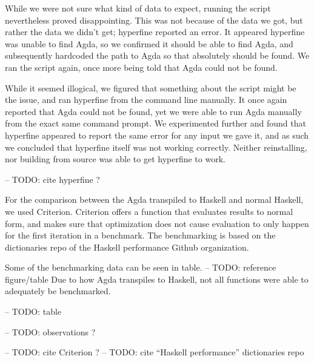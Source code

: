 \documentclass[a4paper,UKenglish,cleveref, autoref, thm-restate]{template/lipics-v2021}
\begin{document}
While we were not sure what kind of data to expect, running the script nevertheless proved disappointing. This was not because of the data we got, but rather the data we didn't get; hyperfine reported an error. It appeared hyperfine was unable to find Agda, so we confirmed it should be able to find Agda, and subsequently hardcoded the path to Agda so that absolutely should be found. We ran the script again, once more being told that Agda could not be found.\newline

While it seemed illogical, we figured that something about the script might be the issue, and ran hyperfine from the command line manually. It once again reported that Agda could not be found, yet we were able to run Agda manually from the exact same command prompt. We experimented further and found that hyperfine appeared to report the same error for any input we gave it, and as such we concluded that hyperfine itself was not working correctly. Neither reinstalling, nor building from source was able to get hyperfine to work.
 
 -- TODO: cite hyperfine ?
 
For the comparison between the Agda transpiled to Haskell and normal Haskell, we used Criterion. Criterion offers a function that evaluates results to normal form, and makes sure that optimization does not cause evaluation to only happen for the first iteration in a benchmark. The benchmarking is based on the dictionaries repo of the Haskell performance Github organization.

Some of the benchmarking data can be seen in table. -- TODO: reference figure/table
Due to how Agda transpiles to Haskell, not all functions were able to adequately be benchmarked.

-- TODO: table

-- TODO: observations ?

-- TODO: cite Criterion ?
-- TODO: cite ``Haskell performance'' dictionaries repo
\end{document}
